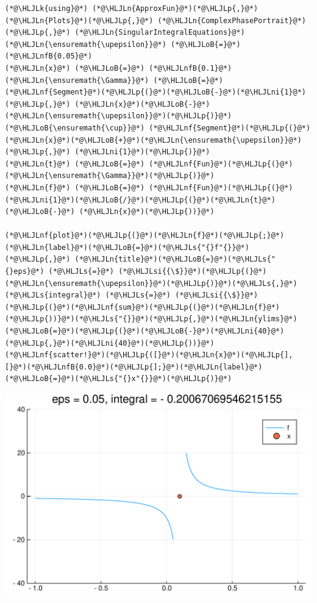 \documentclass[12pt,a4paper]{article}
\newcommand{\HLJLk}[1]{\textcolor[RGB]{148,91,176}{\textbf{#1}}}
\newcommand{\HLJLn}[1]{#1}
\newcommand{\HLJLnf}[1]{\textcolor[RGB]{66,102,213}{#1}}
\newcommand{\HLJLs}[1]{\textcolor[RGB]{201,61,57}{#1}}
\newcommand{\HLJLsi}[1]{#1}
\newcommand{\HLJLnfB}[1]{\textcolor[RGB]{59,151,46}{#1}}
\newcommand{\HLJLni}[1]{\textcolor[RGB]{59,151,46}{#1}}
\newcommand{\HLJLoB}[1]{\textcolor[RGB]{102,102,102}{\textbf{#1}}}
\newcommand{\HLJLp}[1]{#1}
\def\upepsilon{\varepsilon}
\begin{document}
\begin{lstlisting}
(*@\HLJLk{using}@*) (*@\HLJLn{ApproxFun}@*)(*@\HLJLp{,}@*) (*@\HLJLn{Plots}@*)(*@\HLJLp{,}@*) (*@\HLJLn{ComplexPhasePortrait}@*)(*@\HLJLp{,}@*) (*@\HLJLn{SingularIntegralEquations}@*)
(*@\HLJLn{\ensuremath{\upepsilon}}@*) (*@\HLJLoB{=}@*) (*@\HLJLnfB{0.05}@*)
(*@\HLJLn{x}@*) (*@\HLJLoB{=}@*) (*@\HLJLnfB{0.1}@*)
(*@\HLJLn{\ensuremath{\Gamma}}@*) (*@\HLJLoB{=}@*) (*@\HLJLnf{Segment}@*)(*@\HLJLp{(}@*)(*@\HLJLoB{-}@*)(*@\HLJLni{1}@*) (*@\HLJLp{,}@*) (*@\HLJLn{x}@*)(*@\HLJLoB{-}@*)(*@\HLJLn{\ensuremath{\upepsilon}}@*)(*@\HLJLp{)}@*) (*@\HLJLoB{\ensuremath{\cup}}@*) (*@\HLJLnf{Segment}@*)(*@\HLJLp{(}@*)(*@\HLJLn{x}@*)(*@\HLJLoB{+}@*)(*@\HLJLn{\ensuremath{\upepsilon}}@*) (*@\HLJLp{,}@*) (*@\HLJLni{1}@*)(*@\HLJLp{)}@*)
(*@\HLJLn{t}@*) (*@\HLJLoB{=}@*) (*@\HLJLnf{Fun}@*)(*@\HLJLp{(}@*)(*@\HLJLn{\ensuremath{\Gamma}}@*)(*@\HLJLp{)}@*)
(*@\HLJLn{f}@*) (*@\HLJLoB{=}@*) (*@\HLJLnf{Fun}@*)(*@\HLJLp{(}@*)(*@\HLJLni{1}@*)(*@\HLJLoB{/}@*)(*@\HLJLp{(}@*)(*@\HLJLn{t}@*) (*@\HLJLoB{-}@*) (*@\HLJLn{x}@*)(*@\HLJLp{))}@*)

(*@\HLJLnf{plot}@*)(*@\HLJLp{(}@*)(*@\HLJLn{f}@*)(*@\HLJLp{;}@*) (*@\HLJLn{label}@*)(*@\HLJLoB{=}@*)(*@\HLJLs{"{}f"{}}@*)(*@\HLJLp{,}@*) (*@\HLJLn{title}@*)(*@\HLJLoB{=}@*)(*@\HLJLs{"{}eps}@*) (*@\HLJLs{=}@*) (*@\HLJLsi{{\$}}@*)(*@\HLJLp{(}@*)(*@\HLJLn{\ensuremath{\upepsilon}}@*)(*@\HLJLp{)}@*)(*@\HLJLs{,}@*) (*@\HLJLs{integral}@*) (*@\HLJLs{=}@*) (*@\HLJLsi{{\$}}@*)(*@\HLJLp{(}@*)(*@\HLJLnf{sum}@*)(*@\HLJLp{(}@*)(*@\HLJLn{f}@*)(*@\HLJLp{))}@*)(*@\HLJLs{"{}}@*)(*@\HLJLp{,}@*)(*@\HLJLn{ylims}@*)(*@\HLJLoB{=}@*)(*@\HLJLp{(}@*)(*@\HLJLoB{-}@*)(*@\HLJLni{40}@*)(*@\HLJLp{,}@*)(*@\HLJLni{40}@*)(*@\HLJLp{))}@*)
(*@\HLJLnf{scatter!}@*)(*@\HLJLp{([}@*)(*@\HLJLn{x}@*)(*@\HLJLp{],[}@*)(*@\HLJLnfB{0.0}@*)(*@\HLJLp{];}@*)(*@\HLJLn{label}@*)(*@\HLJLoB{=}@*)(*@\HLJLs{"{}x"{}}@*)(*@\HLJLp{)}@*)
\end{lstlisting}

\includegraphics[width=\linewidth]{figures/Lecture14_1_1.pdf}
\end{document}
